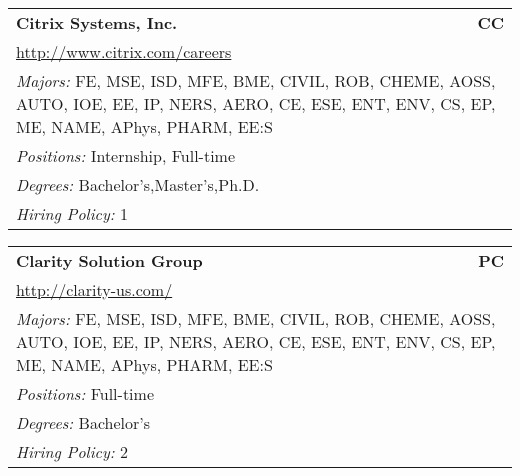 \documentclass[twoside]{article}
\begin{document}
\begin{center}
\begin{multicols}{3}
\begin{FlushLeft}
\begin{minipage}{\columnwidth}
\end{minipage}
 
\begin{minipage}{\columnwidth}\begin{tabularx}{.95\columnwidth}{Xr}
                 {\Large\bf Citrix Systems, Inc.} & {\Large\bf CC}\\
    \multicolumn{2}{p{.95\columnwidth}}{\url{http://www.citrix.com/careers}}\\
    \multicolumn{2}{p{.95\columnwidth}}{\emph{Majors:} FE, MSE, ISD, MFE, BME, CIVIL, ROB, CHEME, AOSS, AUTO, IOE, EE, IP, NERS, AERO, CE, ESE, ENT, ENV, CS, EP, ME, NAME, APhys, PHARM, EE:S}\\
    \multicolumn{2}{p{.95\columnwidth}}{\emph{Positions:} Internship, Full-time}\\
    \multicolumn{2}{p{.95\columnwidth}}{\emph{Degrees:} Bachelor's,Master's,Ph.D.}\\
    \multicolumn{2}{p{.95\columnwidth}}{\emph{Hiring Policy:} 1}\\
    \end{tabularx}
    
\end{minipage}
 
\begin{minipage}{\columnwidth}\begin{tabularx}{.95\columnwidth}{Xr}
                 {\Large\bf Clarity Solution Group} & {\Large\bf PC}\\
    \multicolumn{2}{p{.95\columnwidth}}{\url{http://clarity-us.com/}}\\
    \multicolumn{2}{p{.95\columnwidth}}{\emph{Majors:} FE, MSE, ISD, MFE, BME, CIVIL, ROB, CHEME, AOSS, AUTO, IOE, EE, IP, NERS, AERO, CE, ESE, ENT, ENV, CS, EP, ME, NAME, APhys, PHARM, EE:S}\\
    \multicolumn{2}{p{.95\columnwidth}}{\emph{Positions:} Full-time}\\
    \multicolumn{2}{p{.95\columnwidth}}{\emph{Degrees:} Bachelor's}\\
    \multicolumn{2}{p{.95\columnwidth}}{\emph{Hiring Policy:} 2}\\
    \end{tabularx}
    
\end{minipage}
 

\end{FlushLeft}
\end{multicols}
\end{center}
\end{document}
